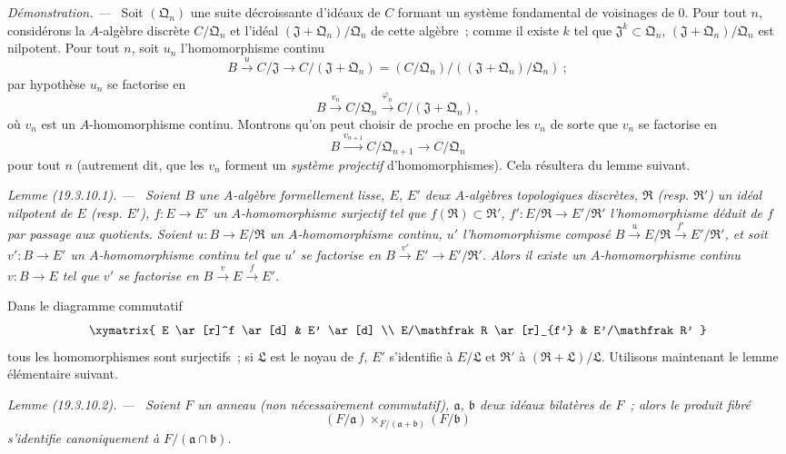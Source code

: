 \documentclass[10pt,oneside]{book}
\makeatletter
\newcommand{\setmanualcurrentlabel}[1]{\def\@currentlabel{#1}}
\newenvironment{lemma}[1][]{%
  \setmanualcurrentlabel{#1}\par\medskip\noindent\itshape Lemme (#1). ---\ }{\par}
\newenvironment{proof}{%
  \par\medskip\noindent\textit{Démonstration. ---\ }}{\par}
\makeatother
\begin{document}
\begin{proof}
Soit $(\mathfrak Q_n)$ une suite décroissante d'idéaux de $C$ formant un
système fondamental de voisinages de $0$. Pour tout $n$, considérons la
$A$-algèbre discrète $C/\mathfrak Q_n$ et l'idéal
$(\mathfrak J+\mathfrak Q_n)/\mathfrak Q_n$ de cette algèbre~; comme il
existe $k$ tel que $\mathfrak J^k\subset\mathfrak Q_n$,
$(\mathfrak J+\mathfrak Q_n)/\mathfrak Q_n$ est nilpotent. Pour tout
$n$, soit $u_n$ l'homomorphisme continu
\[
  B\xrightarrow{u}C/\mathfrak J\to C/(\mathfrak J+\mathfrak Q_n)
  =(C/\mathfrak Q_n)/((\mathfrak J+\mathfrak Q_n)/\mathfrak Q_n)~;
\]
par hypothèse $u_n$ se factorise en
\[
  B\xrightarrow{v_n}C/\mathfrak Q_n
  \xrightarrow{\varphi_n}C/(\mathfrak J+\mathfrak Q_n),
\]
où $v_n$ est un $A$-homomorphisme continu. Montrons qu'on peut choisir de
proche en proche les $v_n$ de sorte que $v_n$ se factorise en
\[
  B\xrightarrow{v_{n+1}}C/\mathfrak Q_{n+1}\to C/\mathfrak Q_n
\]
pour tout $n$ (autrement dit, que les $v_n$ forment un \emph{système
projectif} d'homomorphismes). Cela résultera du lemme suivant.
\end{proof}

\begin{lemma}[19.3.10.1]
\label{0.19.3.10.1-fr}
Soient $B$ une $A$-algèbre formellement lisse, $E$, $E'$ deux $A$-algèbres
topologiques discrètes, $\mathfrak R$ (resp. $\mathfrak R'$) un idéal
nilpotent de $E$ (resp. $E'$), $f:E\to E'$ un $A$-homomorphisme surjectif tel
que $f(\mathfrak R)\subset\mathfrak R'$, $f':E/\mathfrak R\to
E'/\mathfrak R'$ l'homomorphisme déduit de $f$ par passage aux quotients.
Soient $u:B\to E/\mathfrak R$ un $A$-homomorphisme continu, $u'$
l'homomorphisme composé
$B\xrightarrow{u}E/\mathfrak R\xrightarrow{f'}E'/\mathfrak R'$, et soit
$v':B\to E'$ un $A$-homomorphisme continu tel que $u'$ se factorise en
$B\xrightarrow{v'}E'\to E'/\mathfrak R'$. Alors il existe un
$A$-homomorphisme continu $v:B\to E$ tel que $v'$ se factorise en
$B\xrightarrow{v}E\xrightarrow{f}E'$.
\end{lemma}

Dans le diagramme commutatif
\[
\xymatrix{
  E \ar[r]^f \ar[d] & E' \ar[d] \\
  E/\mathfrak R \ar[r]_{f'} & E'/\mathfrak R'
}
\]
tous les homomorphismes sont surjectifs~; si $\mathfrak L$ est le noyau de
$f$, $E'$ s'identifie à $E/\mathfrak L$ et $\mathfrak R'$ à
$(\mathfrak R+\mathfrak L)/\mathfrak L$. Utilisons maintenant le lemme
élémentaire suivant.

\begin{lemma}[19.3.10.2]
\label{0.19.3.10.2-fr}
Soient $F$ un anneau (non nécessairement commutatif), $\mathfrak a$,
$\mathfrak b$ deux idéaux bilatères de $F$~; alors le produit fibré
\[
  (F/\mathfrak a)\times_{F/(\mathfrak a+\mathfrak b)}(F/\mathfrak b)
\]
s'identifie canoniquement à $F/(\mathfrak a\cap\mathfrak b)$.
\end{lemma}
\end{document}
